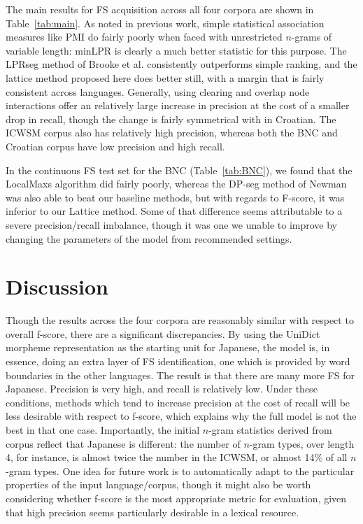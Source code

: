 \documentclass[11pt,letterpaper]{article}
\makeatletter
\def \al {al.\@ }
\newcommand{\tabref}[2][]{Table#1~\ref{#2}\xspace}
\makeatother
\begin{document}
The main results for FS acquisition across all four corpora are shown in \tabref{tab:main}. As noted in previous work, simple statistical association measures like PMI do fairly poorly when faced with unrestricted $n$-grams of variable length: minLPR is clearly a much better statistic for this purpose. The LPRseg method of Brooke et \al {} consistently outperforms simple ranking, and the lattice method proposed here does better still, with a margin that is fairly consistent across languages. Generally, using clearing and overlap node interactions offer an relatively large increase in precision at the cost of a smaller drop in recall, though the change is fairly symmetrical with in Croatian. The ICWSM corpus also has relatively high precision, whereas both the BNC and Croatian corpus have low precision and high recall.

In the continuous FS test set for the BNC (\tabref{tab:BNC}), we found that the LocalMaxs algorithm did fairly poorly, whereas the DP-seg method of Newman \cite{Newman12} was also able to beat our baseline methods, but with regards to F-score, it was inferior to our Lattice method. Some of that difference seems attributable to a severe precision/recall imbalance, though it was one we unable to improve by changing the parameters of the model from recommended settings.


			
\section{Discussion} \label{sec:discussion}

Though the results across the four corpora are reasonably similar with respect to overall f-score, there are a significant discrepancies. By using the UniDict morpheme representation as the starting unit for Japanese, the model is, in essence, doing an extra layer of FS identification, one which is provided by word boundaries in the other languages. The result is that there are many more FS for Japanese. Precision is very high, and recall is relatively low. Under these conditions, methods which tend to increase precision at the cost of recall will be less desirable with respect to f-score, which explains why the full model is not the best in that one case.  Importantly, the initial $n$-gram statistics derived from corpus reflect that Japanese is different: the number of $n$-gram types, over length 4, for instance, is almost twice the number in the ICWSM, or almost 14\% of all $n$-gram types. One idea for future work is to automatically adapt to the particular properties of the input language/corpus, though it might also be worth considering whether f-score is the most appropriate metric for evaluation, given that high precision seems particularly desirable in a lexical resource.
\end{document}
